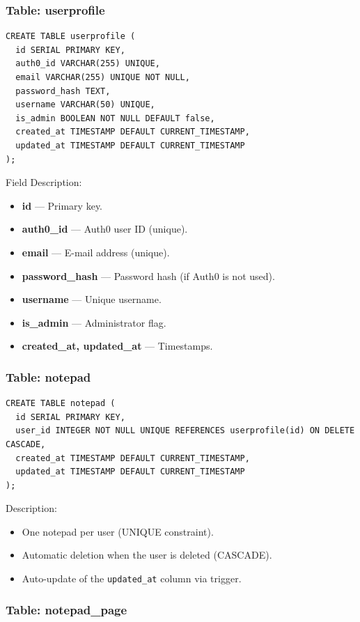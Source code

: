 \subsubsection{Table: userprofile}

\begin{verbatim}
CREATE TABLE userprofile (
  id SERIAL PRIMARY KEY,
  auth0_id VARCHAR(255) UNIQUE,
  email VARCHAR(255) UNIQUE NOT NULL,
  password_hash TEXT,
  username VARCHAR(50) UNIQUE,
  is_admin BOOLEAN NOT NULL DEFAULT false,
  created_at TIMESTAMP DEFAULT CURRENT_TIMESTAMP,
  updated_at TIMESTAMP DEFAULT CURRENT_TIMESTAMP
);
\end{verbatim}

Field Description:
\begin{itemize}
  \item \textbf{id} — Primary key.
  \item \textbf{auth0\_id} — Auth0 user ID (unique).
  \item \textbf{email} — E-mail address (unique).
  \item \textbf{password\_hash} — Password hash (if Auth0 is not used).
  \item \textbf{username} — Unique username.
  \item \textbf{is\_admin} — Administrator flag.
  \item \textbf{created\_at, updated\_at} — Timestamps.
\end{itemize}

\subsubsection{Table: notepad}

\begin{verbatim}
CREATE TABLE notepad (
  id SERIAL PRIMARY KEY,
  user_id INTEGER NOT NULL UNIQUE REFERENCES userprofile(id) ON DELETE CASCADE,
  created_at TIMESTAMP DEFAULT CURRENT_TIMESTAMP,
  updated_at TIMESTAMP DEFAULT CURRENT_TIMESTAMP
);
\end{verbatim}

Description:
\begin{itemize}
  \item One notepad per user (UNIQUE constraint).
  \item Automatic deletion when the user is deleted (CASCADE).
  \item Auto-update of the \texttt{updated\_at} column via trigger.
\end{itemize}

\subsubsection{Table: notepad\_page}

